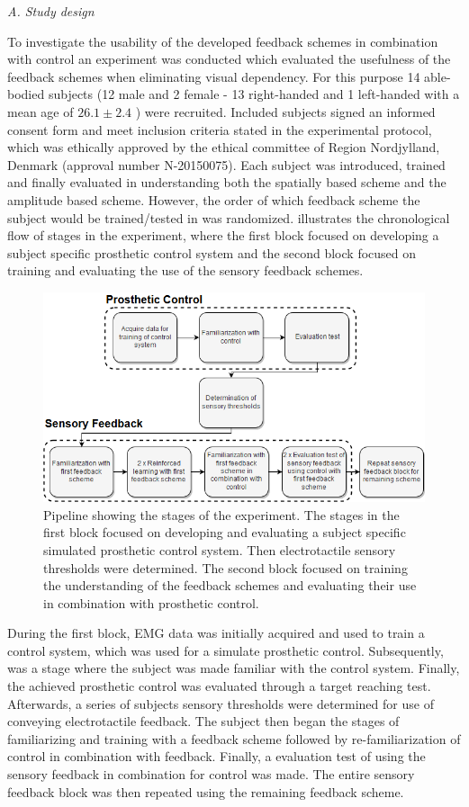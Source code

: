 \textit{A. Study design}

To investigate the usability of the developed feedback schemes in combination with control an experiment was conducted which evaluated the usefulness of the feedback schemes when eliminating visual dependency. For this purpose 14 able-bodied subjects (12 male and 2 female - 13 right-handed and 1 left-handed with a mean age of $26.1 \pm 2.4$ ) were recruited. Included subjects signed an informed consent form and meet inclusion criteria stated in the experimental protocol, which was ethically approved by the ethical committee of Region Nordjylland, Denmark (approval number N-20150075). Each subject was introduced, trained and finally evaluated in understanding both the spatially based scheme and the amplitude based scheme. However, the order of which feedback scheme the subject would be trained/tested in was randomized.  illustrates the chronological flow of stages in the experiment, where the first block focused on developing a subject specific prosthetic control system and the second block focused on training and evaluating the use of the sensory feedback schemes. 

\begin{figure}[H]                 
	\includegraphics[width=.47\textwidth]{figures/std_paper}
	\caption{Pipeline showing the stages of the experiment. The stages in the first block focused on developing and evaluating a subject specific simulated prosthetic control system. Then electrotactile sensory thresholds were determined. The second block focused on training the understanding of the feedback schemes and evaluating their use in combination with prosthetic control.}
	\label{fig:pa:std_pap} 
\end{figure}

During the first block, EMG data was initially acquired and used to train a control system, which was used for a simulate prosthetic control. Subsequently, was a stage where the subject was made familiar with the control system. Finally, the achieved prosthetic control was evaluated through a target reaching test. Afterwards, a series of subjects sensory thresholds were determined for use of conveying electrotactile feedback. The subject then began the stages of familiarizing and training with a feedback scheme followed by re-familiarization of control in combination with feedback. Finally, a evaluation test of using the sensory feedback in combination for control was made. The entire sensory feedback block was then repeated using the remaining feedback scheme. 


